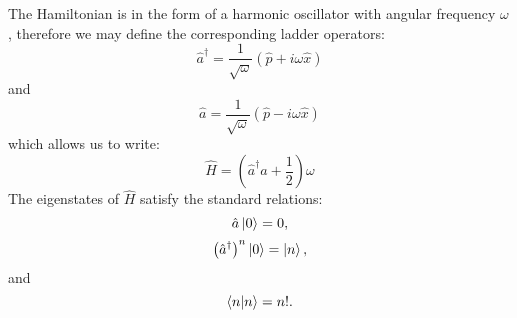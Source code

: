 \documentclass[12pt]{article}
\begin{document}
        The Hamiltonian is in the form of a harmonic oscillator with angular frequency $\omega$, therefore we may define the corresponding ladder operators:
        \begin{equation}
            \label{eq:HarmonicCreation}
            \hat{a}^\dagger = \frac{1}{\sqrt{\omega}}\left(\hat{p}+i\omega\hat{x}\right)
        \end{equation}
        and
        \begin{equation}
            \label{eq:HarmonicAnhilation}
            \hat{a} = \frac{1}{\sqrt{\omega}}\left(\hat{p}-i\omega\hat{x}\right)
        \end{equation}
        which allows us to write:
        \begin{equation}
            \label{HamiltonianLadder}
            \hat{H} = \left(\hat{a}^\dagger\hat{a}+\frac{1}{2}\right)\omega
        \end{equation}
        The eigenstates of $\hat{H}$ satisfy the standard relations:
        \begin{equation}
            \label{LadderOnZero}
            \hat{a}\ket{0} = 0,
        \end{equation}
        \begin{equation}
            \label{LadderNOnZero}
            \left(\hat{a}^\dagger\right)^n\ket{0} = \ket{n},
        \end{equation}
        and
        \begin{equation}
            \label{InnernProduct}
            \braket{n|n}=n!.
        \end{equation}
\end{document}
